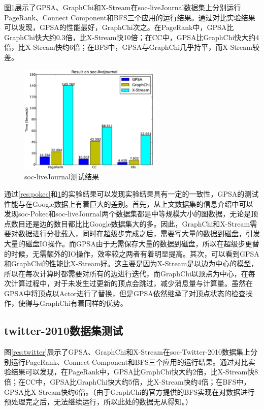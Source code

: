 图\ref{res:journal}展示了GPSA、GraphChi和X-Stream在soc-liveJournal数据集上分别运行PageRank、Connect Component和BFS三个应用的运行结果。通过对比实验结果可以发现，GPSA的性能最好，GraphChi次之。在PageRank中，GPSA比GraphChi快大约0.3倍，比X-Stream快10倍；在CC中，GPSA比GraphChi快大约4倍，比X-Stream快约6倍；在BFS中，GPSA与GraphChi几乎持平，而X-Stream较差。

\begin{figure}[htbp]
\centering
\includegraphics[width=0.6\textwidth,scale=0.8]{myfigures/journaltime2.eps}
\caption{soc-liveJournal测试结果}
\label{res:journal}
\end{figure}

通过\ref{res:pokec}和\ref{res:journal}的实验结果可以发现实验结果具有一定的一致性，GPSA的测试性能与在Google数据上有着巨大的差别。首先，从上文数据集的信息介绍中可以发现soc-Pokec和soc-liveJournal两个数据集都是中等规模大小的图数据，无论是顶点数目还是边的数目都比比Google数据集大的多。因此，GraphChi和X-Stream需要对数据进行分批载入，同时在超级步完成之后，需要写大量的数据到磁盘，引发大量的磁盘IO操作。而GPSA由于无需保存大量的数据到磁盘，所以在超级步更替的时候，无需额外的IO操作，效率较之两者有着明显提高。其次，可以看到GPSA和GraphChi的性能比X-Stream好。这主要是因为X-Stream是以边为中心的模型，所以在每次计算时都需要对所有的边进行迭代，而GraphChi以顶点为中心，在每次计算过程中，对于未发生过更新的顶点会跳过，减少消息量与计算量。虽然在GPSA中将顶点以Actor进行了替换，但是GPSA依然继承了对顶点状态的检查操作，使得与GraphChi有着同样的优势。

\subsection{twitter-2010数据集测试}
图\ref{res:twitter}展示了GPSA、GraphChi和X-Stream在soc-Twitter-2010数据集上分别运行PageRank、Connect Component和BFS三个应用的运行结果。通过对比实验结果可以发现，在PageRank中，GPSA比GraphChi快大约2倍，比X-Stream快8倍；在CC中，GPSA比GraphChi快大约5倍，比X-Stream快约4倍；在BFS中，GPSA比X-Stream快约6倍。（由于GraphChi的官方提供的BFS实现在对数据进行预处理完之后，无法继续运行，所以此处的数据无从得知。）

